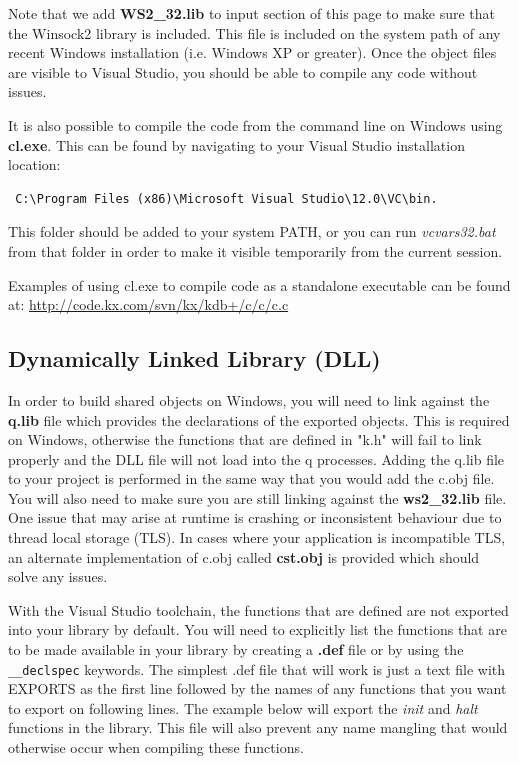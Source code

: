 Note that we add \textbf{WS2\_32.lib} to input section of this page to make sure that the Winsock2 library is included. This file is included on the system path of any recent Windows installation (i.e. Windows XP or greater). Once the object files are visible to Visual Studio, you should be able to compile any code without issues.
 
 It is also possible to compile the code from the command line on Windows using \textbf{cl.exe}. This can be found by navigating to your Visual Studio installation
 location:
 
 \begin{lstlisting}
 C:\Program Files (x86)\Microsoft Visual Studio\12.0\VC\bin.
 \end{lstlisting}
 
 This folder should be added to your system PATH, or you can run \textit{vcvars32.bat} from that folder in order to make it visible temporarily from the current session.
 
 Examples of using cl.exe to compile code as a standalone executable can be found at: 
 \url{http://code.kx.com/svn/kx/kdb+/c/c/c.c}
 
 \subsection{Dynamically Linked Library (DLL)}
 
 In order to build shared objects on Windows, you will need to link against the \textbf{q.lib} file which provides the declarations of the exported objects. This is required on Windows, otherwise the functions that are defined in "k.h" will fail to link properly and the DLL file will not load into the q processes. Adding the q.lib file to your project is performed in the same way that you would add the c.obj file. You will also need to make sure you are still linking against the \textbf{ws2\_32.lib} file. One issue that may arise at runtime is crashing or inconsistent behaviour due to thread local storage (TLS). In cases where your application is incompatible TLS, an alternate implementation of c.obj called \textbf{cst.obj} is provided which should solve any issues.
 
 With the Visual Studio toolchain, the functions that are defined are not exported into your library
 by default. You will need to explicitly list the functions that are to be made available in your
 library by creating a \textbf{.def} file or by using the \verb|__declspec| keywords. The simplest .def file that
 will work is just a text file with EXPORTS as the first line followed by the names of any functions
 that you want to export on following lines. The example below will export the \textit{init} and \textit{halt} functions
 in the library. This file will also prevent any name mangling that would otherwise occur when compiling
 these functions.
 
